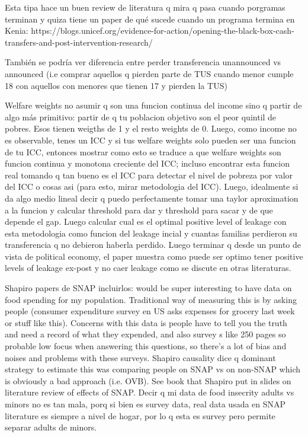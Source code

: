 \documentclass[12pt]{article}
\begin{document}
Esta tipa hace un buen review de literatura q mira q pasa cuando porgramas terminan y quiza tiene un paper de qué sucede cuando un programa termina en Kenia: https://blogs.unicef.org/evidence-for-action/opening-the-black-box-cash-transfers-and-post-intervention-research/

También se podría ver diferencia entre perder transferencia unannounced vs announced (i.e comprar aquellos q pierden parte de TUS cuando menor cumple 18 con aquellos con menores que tienen 17 y pierden la TUS)

Welfare weights no asumir q son una funcion continua del income sino q partir de algo más primitivo: partir de q tu poblacion objetivo son el peor quintil de pobres. Esos tienen weigths de 1 y el resto weights de 0. Luego, como income no es observable, tenes un ICC y si tus welfare weights solo pueden ser una funcion de tu ICC, entonces mostrar como esto se traduce a que welfare weights son funcion continua y monotona creciente del ICC; incluso encontrar esta funcion real tomando q tan bueno es el ICC para detectar el nivel de pobreza por valor del ICC o cosas asi (para esto, mirar metodologia del ICC). Luego, idealmente si da algo medio lineal decir q puedo perfectamente tomar una taylor aproximation a la funcion y calcular threshold para dar y threshold para sacar y de que depende el gap. Luego calcular cual es el optimal positive level of leakage con esta metodologia como funcion del leakage incial y cuantas familias perdieron su transferencia q no debieron haberla perdido. Luego terminar q desde un punto de vista de political economy, el paper muestra como puede ser optimo tener positive levels of leakage ex-post y no caer leakage como se discute en otras literaturas.

Shapiro papers de SNAP incluirlos: would be super interesting to have data on food spending for my population. Traditional way of measuring this is by asking people (consumer expenditure survey en US asks expenses for grocery last week or stuff like this). Concerns with this data is people have to tell you the truth and need a record of what they expended, and also survey s like 250 pages so probable low focus when answering this questions, so there's a lot of bias and noises and problems with these surveys.
Shapiro causality dice q dominant strategy to estimate this was comparing people on SNAP vs on non-SNAP which is obviously a bad approach (i.e. OVB). See book that Shapiro put in slides on literature review of effects of SNAP. Decir q mi data de food insecrity adults vs minors no es tan mala, porq si bien es survey data, real data usada en SNAP literature es siempre a nivel de hogar, por lo q esta es survey pero permite separar adults de minors.
\end{document}
